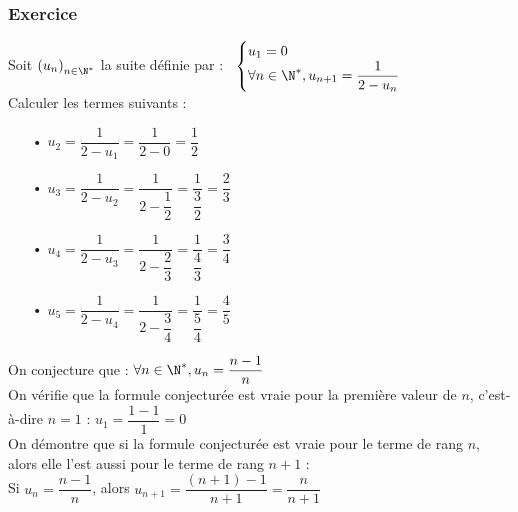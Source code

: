 \subsubsection{Exercice }

Soit $\left(u_n\right)_{n \in \N^*}$ la suite définie par :$ \; \; \; \begin{cases}
u_1 = 0 \\
\forall n \in \N^*, u_{n+1} = \dfrac{1}{2 - u_n} \\
\end{cases}$ \\

Calculer les termes suivants : \\

\begin{itemize}
\item[•] $u_2 = \dfrac{1}{2 - u_1} = \dfrac{1}{2 - 0} = \dfrac{1}{2}$ \vspace*{.3cm} \\
\item[•] $ u_3 = \dfrac{1}{2 - u_2} = \dfrac{1}{2 - \dfrac{1}{2}} = \dfrac{1}{\dfrac{3}{2}} = \dfrac{2}{3}$ \vspace*{.3cm} \\
\item[•] $u_4 = \dfrac{1}{2 - u_3} = \dfrac{1}{2 - \dfrac{2}{3}} = \dfrac{1}{\dfrac{4}{3}} = \dfrac{3}{4}$ \vspace*{.3cm} \\
\item[•] $u_5 = \dfrac{1}{2 - u_4} = \dfrac{1}{2 - \dfrac{3}{4}} = \dfrac{1}{\dfrac{5}{4}} = \dfrac{4}{5}$ \vspace*{.3cm} \\
\end{itemize}

\vspace*{.3cm}

On conjecture que : $\forall n \in \N^*, u_n = \dfrac{n - 1}{n}$ \\

On vérifie que la formule conjecturée est vraie pour la première valeur de $n$, c'est-à-dire $n = 1$ : $u_1 = \dfrac{1 - 1}{1} = 0$ \\

On démontre que si la formule conjecturée est vraie pour le terme de rang $n$, alors elle l'est aussi pour le terme de rang $n + 1$ : \\

Si $u_n = \dfrac{n-1}{n}$, alors $ u_{n+1} = \dfrac{\left(n+1\right) - 1}{n + 1} = \dfrac{n}{n+1}$ \\

